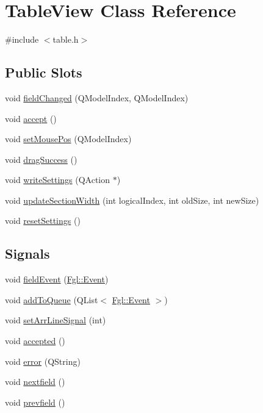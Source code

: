 \hypertarget{classTableView}{
\section{TableView Class Reference}
\label{classTableView}
}


{\ttfamily \#include $<$table.h$>$}

\subsection*{Public Slots}
\begin{DoxyCompactItemize}
\item 
void \hyperlink{classTableView_a4c5b64ca3ffb2289d6b9030942cfbfd5}{fieldChanged} (QModelIndex, QModelIndex)
\item 
void \hyperlink{classTableView_a4ae2229ec68bc96ada98844bc47434f5}{accept} ()
\item 
void \hyperlink{classTableView_ab31519c042431fa0e23f04b719156776}{setMousePos} (QModelIndex)
\item 
void \hyperlink{classTableView_ae24787bc253d6f181c13fc58bffd7ba2}{dragSuccess} ()
\item 
void \hyperlink{classTableView_a70c32ac02d45e8723f3521cf80f3862e}{writeSettings} (QAction $\ast$)
\item 
void \hyperlink{classTableView_a643a93fdbb136136598e30dc3b3ad5e4}{updateSectionWidth} (int logicalIndex, int oldSize, int newSize)
\item 
void \hyperlink{classTableView_af8a2f8a181aeb8d565fca8be2fe1437c}{resetSettings} ()
\end{DoxyCompactItemize}
\subsection*{Signals}
\begin{DoxyCompactItemize}
\item 
void \hyperlink{classTableView_aadaf88a599aa680ea0d6a3887ed8289d}{fieldEvent} (\hyperlink{structFgl_1_1Event}{Fgl::Event})
\item 
void \hyperlink{classTableView_ae62964a1e3681bf228009babab06d55e}{addToQueue} (QList$<$ \hyperlink{structFgl_1_1Event}{Fgl::Event} $>$)
\item 
void \hyperlink{classTableView_a5f99090ec924b96b7f2b026c47f580e6}{setArrLineSignal} (int)
\item 
void \hyperlink{classTableView_ad4f6aa906c014bed4437f67817e990e0}{accepted} ()
\item 
void \hyperlink{classTableView_a2ae0fadd583c6d25c0c8759d2b01ba6a}{error} (QString)
\item 
void \hyperlink{classTableView_a305e99f446bebdec5735d14281e06de9}{nextfield} ()
\item 
void \hyperlink{classTableView_a7648f39aa6fe83ae729c874f5437dba6}{prevfield} ()
\end{DoxyCompactItemize}

